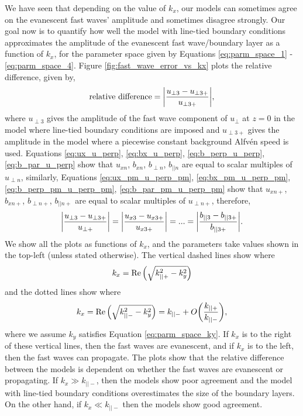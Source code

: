 We have seen that depending on the value of $k_x$, our models can sometimes agree on the evanescent fast waves' amplitude and sometimes disagree strongly. Our goal now is to quantify how well the model with line-tied boundary conditions approximates the amplitude of the evanescent fast wave/boundary layer as a function of $k_x$, for the parameter space given by Equations \ref{eq:parm_space_1} - \ref{eq:parm_space_4}. Figure \ref{fig:fast_wave_error_vs_kx} plots the relative difference, given by,
\begin{equation}
    \label{eq:relative_difference}
    \text{relative difference} = \abs{\frac{u_{\perp3} - u_{\perp 3+}}{u_{\perp 3+}}},
\end{equation}
where $u_{\perp3}$ gives the amplitude of the fast wave component of $u_\perp$ at $z=0$ in the model where line-tied boundary conditions are imposed and $u_{\perp 3+}$ gives the amplitude in the model where a piecewise constant background Alfv\'en speed is used. Equations \eqref{eq:ux_u_perp}, \eqref{eq:bx_u_perp}, \eqref{eq:b_perp_u_perp}, \eqref{eq:b_par_u_perp} show that $u_{xn}$, $b_{xn}$, $b_{\perp n}$, $b_{|| n}$ are equal to scalar multiples of $u_{\perp n}$, similarly, Equations \eqref{eq:ux_pm_u_perp_pm}, \eqref{eq:bx_pm_u_perp_pm}, \eqref{eq:b_perp_pm_u_perp_pm}, \eqref{eq:b_par_pm_u_perp_pm} show that $u_{xn+}$, $b_{xn+}$, $b_{\perp n+}$, $b_{|| n+}$ are equal to scalar multiples of $u_{\perp n+}$, therefore,
\begin{equation}
    \abs{\frac{u_{\perp3} - u_{\perp 3+}}{u_{\perp +}}} = \abs{\frac{u_{x3} - u_{x 3+}}{u_{x 3+}}} = ... = \abs{\frac{b_{||3} - b_{|| 3+}}{b_{|| 3+}}}.
\end{equation}
We show all the plots as functions of $k_x$, and the parameters take values shown in the top-left (unless stated otherwise). The vertical dashed lines show where 
\[k_x = \Re\qty(\sqrt{k_{||+}^2-k_y^2})\] 
and the dotted lines show where 
\[k_x = \Re\qty(\sqrt{k_{||-}^2-k_y^2})= k_{||-} + O\qty(\frac{k_{||+}}{k_{||-}}),\]
where we assume $k_y$ satisfies Equation \eqref{eq:parm_space_ky}.
If $k_x$ is to the right of these vertical lines, then the fast waves are evanescent, and if $k_x$ is to the left, then the fast waves can propagate. The plots show that the relative difference between the models is dependent on whether the fast waves are evanescent or propagating. If $k_x \gg k_{||-}$, then the models show poor agreement and the model with line-tied boundary conditions overestimates the size of the boundary layers. On the other hand, if $k_x \ll k_{||-}$
then the models show good agreement.

